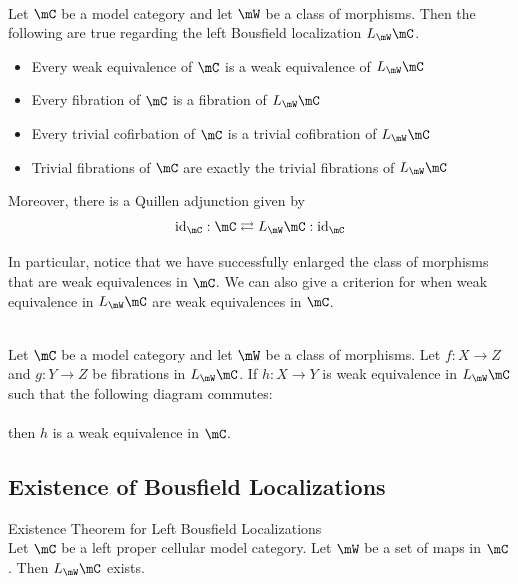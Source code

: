 \documentclass[a4paper]{article}
\begin{document}
\begin{thm}{}{}\\ Let $\mC$ be a model category and let $\mW$ be a class of morphisms. Then the following are true regarding the left Bousfield localization $L_\mW\mC$. 
\begin{itemize}
\item Every weak equivalence of $\mC$ is a weak equivalence of $L_\mW\mC$
\item Every fibration of $\mC$ is a fibration of $L_\mW\mC$
\item Every trivial cofirbation of $\mC$ is a trivial cofibration of $L_\mW\mC$
\item Trivial fibrations of $\mC$ are exactly the trivial fibrations of $L_\mW\mC$
\end{itemize}
Moreover, there is a Quillen adjunction given by $$\text{id}_\mC:\mC\rightleftarrows L_\mW\mC:\text{id}_\mC$$
\end{thm}

In particular, notice that we have successfully enlarged the class of morphisms that are weak equivalences in $\mC$. We can also give a criterion for when weak equivalence in $L_\mW\mC$ are weak equivalences in $\mC$. 

\begin{prp}{}{}\\ Let $\mC$ be a model category and let $\mW$ be a class of morphisms. Let $f:X\to Z$ and $g:Y\to Z$ be fibrations in $L_\mW\mC$. If $h:X\to Y$ is weak equivalence in $L_\mW\mC$ such that the following diagram commutes: \\
\\
then $h$ is a weak equivalence in $\mC$. 
\end{prp}

\subsection{Existence of Bousfield Localizations}
\begin{thm}{Existence Theorem for Left Bousfield Localizations}{}\\ Let $\mC$ be a left proper cellular model category. Let $\mW$ be a set of maps in $\mC$. Then $L_\mW\mC$ exists. 
\end{thm}
\end{document}
